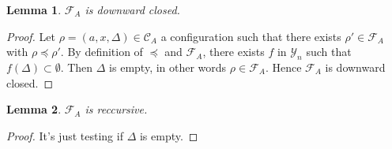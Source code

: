 \documentclass[a4paper,10pt]{report}
\newtheorem{lm}{Lemma}[thr]
\newcommand{\C}{\mathcal{C}_{A}}
\newcommand{\F}{\mathcal{F}_{A}}
\newcommand{\Y}{\mathcal{Y}_{n}}
\begin{document}
\begin{lm} \label{cd5}
  $\F$ is downward closed. 
\end{lm}
\begin{proof}
  Let $\rho=(a,x,\Delta) \in \C$ a configuration such that there exists $\rho' \in \F$ with $\rho \preceq \rho'$.
  By definition of $\preceq$ and $\F$, there exists $f$ in $\Y$ such that $f(\Delta) \subset \emptyset$.
  Then $\Delta$ is empty, in other words $\rho \in \F$.
  Hence $\F$ is downward closed. 
\end{proof}

\begin{lm} \label{cd6}
  $\F$ is reccursive.
\end{lm}

\begin{proof}
  It's just testing if $\Delta$ is empty.
\end{proof}
\end{document}
